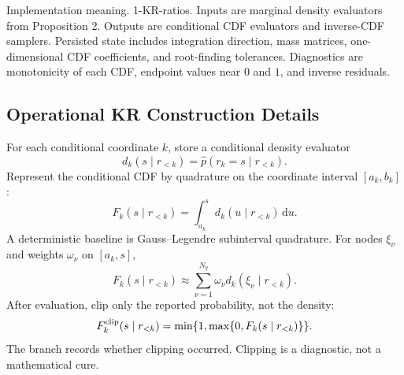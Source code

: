 \documentclass[11pt]{article}
\numberwithin{equation}{section}
\newcommand{\dd}{\,\mathrm d}
\begin{document}
Implementation meaning. 1-KR-ratios.  Inputs are marginal density
evaluators from Proposition 2.  Outputs are conditional CDF evaluators and
inverse-CDF samplers.  Persisted state includes integration direction, mass
matrices, one-dimensional CDF coefficients, and root-finding tolerances.
Diagnostics are monotonicity of each CDF, endpoint values near \(0\) and \(1\),
and inverse residuals.

\subsection*{Operational KR Construction Details}

For each conditional coordinate \(k\), store a conditional density evaluator
\begin{equation}
    d_k(s\mid r_{<k})
    =
    \widehat p(r_k=s\mid r_{<k}).
    \label{eq:p24-p23-krops1}
\end{equation}
Represent the conditional CDF by quadrature on the coordinate interval
\([a_k,b_k]\):
\begin{equation}
    F_k(s\mid r_{<k})
    =
    \int_{a_k}^{s}d_k(u\mid r_{<k})\dd u.
    \label{eq:p24-p23-krops2}
\end{equation}
A deterministic baseline is Gauss--Legendre subinterval quadrature.  For nodes
\(\xi_\nu\) and weights \(\omega_\nu\) on \([a_k,s]\),
\begin{equation}
    F_k(s\mid r_{<k})
    \approx
    \sum_{\nu=1}^{N_q}\omega_\nu d_k(\xi_\nu\mid r_{<k}).
    \label{eq:p24-p23-krops3}
\end{equation}
After evaluation, clip only the reported probability, not the density:
\begin{equation}
    F_k^{\rm clip}(s\mid r_{<k})
    =
    \min\{1,\max\{0,F_k(s\mid r_{<k})\}\}.
    \label{eq:p24-p23-krops4}
\end{equation}
The branch records whether clipping occurred.  Clipping is a diagnostic, not a
mathematical cure.
\end{document}
